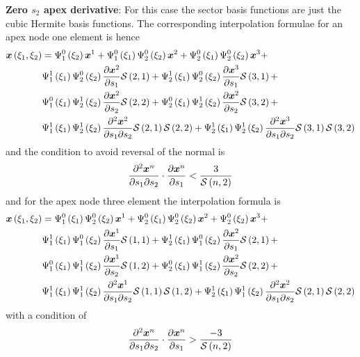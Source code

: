 \textbf{Zero $s_{2}$ apex derivative}: For this case the sector basis
functions are just the cubic Hermite basis functions. The corresponding
interpolation formulae for an apex node one element is hence
\begin{equation}
  \begin{split}
    \fnof{\vect{x}}{\xione,\xitwo} &= \chbfn{1}{0}{\xitwo}
    \nodept{\vect{x}}{1} + 
     \chbfn{1}{0}{\xione}\chbfn{2}{0}{\xitwo}\nodept{\vect{x}}{2} +
    \chbfn{2}{0}{\xione}\chbfn{2}{0}{\xitwo}\nodept{\vect{x}}{3} + \\
    & \chbfn{1}{1}{\xione}\chbfn{2}{0}{\xitwo}\delby{\nodept{\vect{x}}{2}}{s_{1}}
    \nsftwo{2}{1}+
    \chbfn{2}{1}{\xione}\chbfn{2}{0}{\xitwo}\delby{\nodept{\vect{x}}{3}}{s_{1}}
    \nsftwo{3}{1} + \\ 
    & \chbfn{1}{0}{\xione}\chbfn{2}{1}{\xitwo}\delby{\nodept{\vect{x}}{2}}{s_{2}}
    \nsftwo{2}{2}+
    \chbfn{2}{0}{\xione}\chbfn{2}{1}{\xitwo}\delby{\nodept{\vect{x}}{2}}{s_{2}}
    \nsftwo{3}{2} + \\ 
    & \chbfn{1}{1}{\xione}\chbfn{2}{1}{\xitwo}\deltwoby{\nodept{\vect{x}}{2}}
      {s_{1}}{s_{2}}\nsftwo{2}{1}\nsftwo{2}{2} + 
    \chbfn{2}{1}{\xione}\chbfn{2}{1}{\xitwo}\deltwoby{\nodept{\vect{x}}{3}}
      {s_{1}}{s_{2}}\nsftwo{3}{1}\nsftwo{3}{2}
  \end{split}
\end{equation}
and the condition to avoid reversal of the normal is
\begin{equation}
  \dotprod{\deltwoby{\nodept{\vect{x}}{n}}{s_{1}}{s_{2}}}{\delby{\nodept{\vect{x}}
      {n}}{s_{1}}}<\dfrac{3}{\nsftwo{n}{2}}
\end{equation}
and for the apex node three element the interpolation formula is
\begin{equation}
  \begin{split}
    \fnof{\vect{x}}{\xione,\xitwo} &=
    \chbfn{1}{0}{\xione}\chbfn{2}{0}{\xitwo}\nodept{\vect{x}}{1} +
    \chbfn{2}{0}{\xione}\chbfn{2}{0}{\xitwo}\nodept{\vect{x}}{2} + 
    \chbfn{2}{0}{\xitwo}\nodept{\vect{x}}{3} + \\
    & \chbfn{1}{1}{\xione}\chbfn{1}{0}{\xitwo}\delby{\nodept{\vect{x}}{1}}{s_{1}}
    \nsftwo{1}{1}+
    \chbfn{2}{1}{\xione}\chbfn{1}{0}{\xitwo}\delby{\nodept{\vect{x}}{2}}{s_{1}}
    \nsftwo{2}{1} + \\ 
    & \chbfn{1}{0}{\xione}\chbfn{1}{1}{\xitwo}\delby{\nodept{\vect{x}}{1}}{s_{2}}
    \nsftwo{1}{2}+
    \chbfn{2}{0}{\xione}\chbfn{1}{1}{\xitwo}\delby{\nodept{\vect{x}}{2}}{s_{2}}
    \nsftwo{2}{2} + \\ 
    & \chbfn{1}{1}{\xione}\chbfn{1}{1}{\xitwo}\deltwoby{\nodept{\vect{x}}{1}}
      {s_{1}}{s_{2}}\nsftwo{1}{1}\nsftwo{1}{2} + 
    \chbfn{2}{1}{\xione}\chbfn{1}{1}{\xitwo}\deltwoby{\nodept{\vect{x}}{2}}
      {s_{1}}{s_{2}}\nsftwo{2}{1}\nsftwo{2}{2}
  \end{split}
\end{equation}
with a condition of
\begin{equation}
  \dotprod{\deltwoby{\nodept{\vect{x}}{n}}{s_{1}}{s_{2}}}{\delby{\nodept{\vect{x}}
      {n}}{s_{1}}}>\dfrac{-3}{\nsftwo{n}{2}}
\end{equation}

